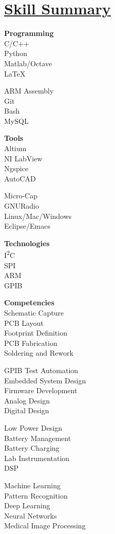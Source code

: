 \documentclass[a4paper, 11pt]{article}
\begin{document}
\section{\underline{Skill Summary}}
  \parbox{0.16\textwidth}{
    \textbf{Programming}\\
    C/C++\\
    Python\\
    Matlab/Octave\\
    \LaTeX
  } 
  \parbox{0.18\textwidth}{
    \bigskip
    ARM Assembly\\
    Git\\
    Bash\\
    MySQL 
  } \hfill
  \parbox{0.14\textwidth}{
    \textbf{Tools}\\
    Altium\\
    NI LabView\\
    Ngspice\\
    AutoCAD
  }
  \parbox{0.23\textwidth}{
    \bigskip
    Micro-Cap\\
    GNURadio\\
    Linux/Mac/Windows\\
    Eclipse/Emacs    
  } \hfill\ignorespaces
  \parbox{0.15\textwidth}{
    \textbf{Technologies}\\
    I\textsuperscript{2}C\\
    SPI\\
    ARM\\
    GPIB
  } \hfill
  \medskip
  
  \parbox{0.23\textwidth}{
    \textbf{Competencies}\\
    Schematic Capture\\
    PCB Layout\\
    Footprint Definition\\
    PCB Fabrication\\
    Soldering and Rework
  } \hfill
  \parbox{0.26\textwidth}{
    \bigskip
    GPIB Test Automation\\
    Embedded System Design\\
    Firmware Development\\
    Analog Design\\
    Digital Design
  } \hfill
  \parbox{0.21\textwidth}{
    \bigskip
    Low Power Design\\
    Battery Management\\
    Battery Charging\\
    Lab Instrumentation\\
    DSP
    } \hfill
  \parbox{0.25\textwidth}{
    \bigskip
    Machine Learning\\
    Pattern Recognition\\
    Deep Learning\\
    Neural Networks\\
    Medical Image Processing
  } \hfill
 
\end{document}
